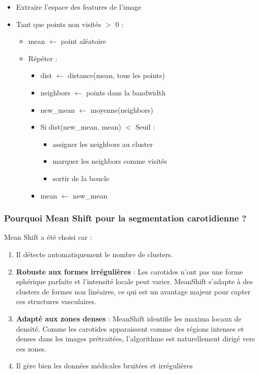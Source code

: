\documentclass{article}
\begin{document}
            \begin{itemize}
                \item Extraire l'espace des features de l'image
                \item Tant que points non visités $>$ 0 :
                \begin{itemize}
                    \item mean $\gets$ point aléatoire
                    \item Répéter :
                    \begin{itemize}
                        \item dist $\gets$ distance(mean, tous les points)
                        \item neighbors $\gets$ points dans la bandwidth
                        \item new\_mean $\gets$ moyenne(neighbors)
                        \item Si dist(new\_mean, mean) $<$ Seuil :
                            \begin{itemize}
                                \item assigner les neighbors au cluster
                                \item marquer les neighbors comme visités
                                \item sortir de la boucle
                            \end{itemize}
                        \item mean $\gets$ new\_mean
                    \end{itemize}
                \end{itemize}
            \end{itemize}
        
        \subsubsection*{Pourquoi Mean Shift pour la segmentation carotidienne ?}
            Mean Shift a été choisi car :
            \begin{enumerate}
            	\item Il détecte automatiquement le nombre de clusters.
            	\item \textbf{Robuste aux formes irrégulières} : Les carotides n’ont pas une forme sphérique parfaite et l’intensité locale peut varier. MeanShift s’adapte à des clusters de formes non linéaires, ce qui est un avantage majeur pour capter ces structures vasculaires.

                \item \textbf{Adapté aux zones denses} : MeanShift identifie les maxima locaux de densité. Comme les carotides apparaissent comme des régions intenses et denses dans les images prétraitées, l’algorithme est naturellement dirigé vers ces zones.

                \item Il gère bien les données médicales bruitées et irrégulières
            \end{enumerate}
    
\end{document}
